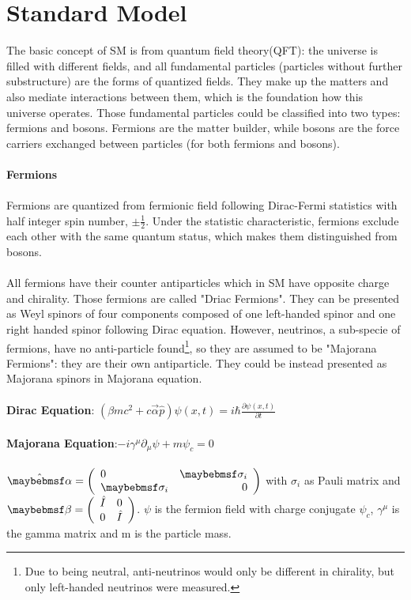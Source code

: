 \section{Standard Model}
The basic concept of SM is from quantum field theory(QFT): the universe is filled with different fields, and all fundamental particles (particles without further substructure) are the forms of quantized fields. They make up the matters and also mediate interactions between them, which is the foundation how this universe operates. Those fundamental particles could be classified into two types: fermions and bosons. Fermions are the matter builder, while bosons are the force carriers exchanged between particles (for both fermions and bosons). 
\\
\\{\bf Fermions}
\\
\\Fermions are quantized from fermionic field following Dirac-Fermi statistics with half integer spin number, $\pm\frac{1}{2}$. Under the statistic characteristic, fermions exclude each other with the same quantum status, which makes them distinguished from bosons. \\
\\
All fermions have their counter antiparticles which in SM have opposite charge and chirality. Those fermions are called "Driac Fermions". They can be presented as Weyl spinors of four components composed of one left-handed spinor and one right handed spinor following Dirac equation. However, neutrinos, a sub-specie of fermions, have no anti-particle found\footnote{Due to being neutral, anti-neutrinos would only be different in chirality, but only left-handed neutrinos were measured.}, so they are assumed to be "Majorana Fermions": they are their own antiparticle. They could be instead presented as Majorana spinors in Majorana equation. 
\\
\\{\bf Dirac Equation}: $(\beta mc^2+c\overrightarrow{\alpha}\hat{p})\psi(x,t)=i\hbar\frac{\partial{\psi(x,t)}}{\partial{t}}$
\\
\\{\bf Majorana Equation}:$-i\gamma^\mu\partial_\mu\psi+m\psi_c=0$
\\
\\$ \hat{\alpha}= \left( \begin{array}{l  r}  0& \sigma_i  \\  \sigma_i&0   \end{array}\right) $ with $\sigma_i$ as Pauli matrix and $\beta=\left( \begin{array}{l r} \hat{I}&0 \\ 0 & \hat{I}\end{array}\right)$.  $\psi$ is the fermion field with charge conjugate $\psi_c$, $\gamma^\mu$ is the gamma matrix and m is the particle mass.
